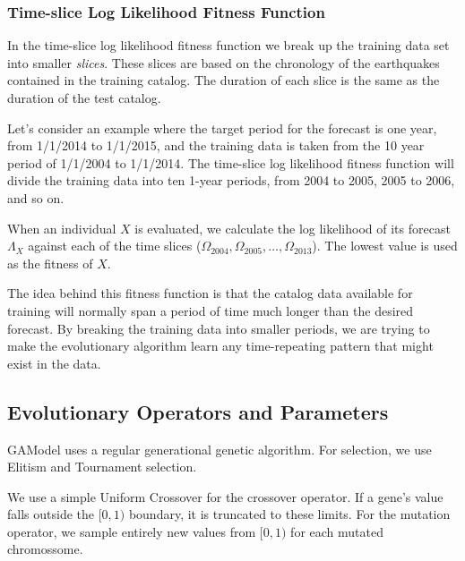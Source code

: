 \documentclass{sig-alternate}
\begin{document}
\subsubsection{Time-slice Log Likelihood Fitness Function}

In the time-slice log likelihood fitness function we break up the
training data set into smaller \emph{slices}. These slices are based
on the chronology of the earthquakes contained in the training
catalog. The duration of each slice is the same as the duration of the
test catalog.

Let's consider an example where the target period for the forecast is
one year, from 1/1/2014 to 1/1/2015, and the training data is taken
from the 10 year period of 1/1/2004 to 1/1/2014. The time-slice log
likelihood fitness function will divide the training data into ten
1-year periods, from 2004 to 2005, 2005 to 2006, and so on. 

When an individual $X$ is evaluated, we calculate the log likelihood
of its forecast $\Lambda_X$ against each of the time slices
($\Omega_{2004}, \Omega_{2005}, \dots, \Omega_{2013}$). The lowest
value is used as the fitness of $X$.

The idea behind this fitness function is that the catalog data
available for training will normally span a period of time much longer
than the desired forecast. By breaking the training data into smaller
periods, we are trying to make the evolutionary algorithm learn any
time-repeating pattern that might exist in the data.

\subsection{Evolutionary Operators and Parameters}

GAModel uses a regular generational genetic algorithm. For selection,
we use Elitism and Tournament selection. 

We use a simple Uniform Crossover for the crossover operator. If a gene's value
falls outside the $[0,1)$ boundary, it is truncated to these
  limits. For the mutation operator, we sample entirely new values
  from $[0,1)$ for each mutated chromossome.
\end{document}
